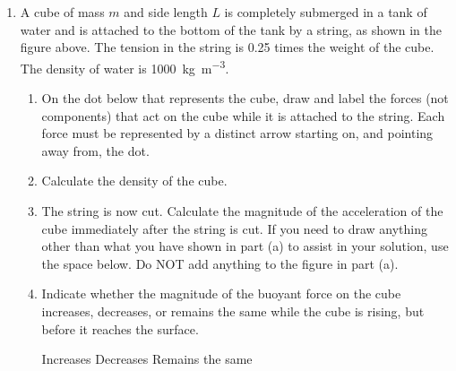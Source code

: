 \documentclass{../../../oss-classkick}
\begin{document}
\begin{enumerate}
  \begin{center}
  \end{center}
\item A cube of mass $m$ and side length $L$ is completely submerged in a tank
  of water and is attached to the bottom of the tank by a string, as shown in
  the figure above. The tension in the string is 0.25 times the weight of the
  cube. The density of water is \SI{1000}{\kilo\gram\per\metre\cubed}.
  \begin{enumerate}
  \item On the dot below that represents the cube, draw and label the forces
    (not components) that act on the cube while it is attached to the string.
    Each force must be represented by a distinct arrow starting on, and pointing
    away from, the dot.
    \begin{center}
      \vspace{.5in}
      \vspace{.5in}
    \end{center}
  \item Calculate the density of the cube.
    \vspace{1.5in}

  \item The string is now cut. Calculate the magnitude of the
    acceleration of the cube immediately after the string is cut. If you need
    to draw anything other than what you have shown in part (a) to assist in
    your solution, use the space below. Do NOT add anything to the figure in
    part (a).
    \vspace{1.5in}
    
  \item Indicate whether the magnitude of the buoyant force on the cube
    increases, decreases, or remains the same while the cube is rising, but
    before it reaches the surface.

    \vspace{.1in}
    \underline{\hspace{.3in}} Increases\hspace{.2in}
    \underline{\hspace{.3in}} Decreases\hspace{.2in}
    \underline{\hspace{.3in}} Remains the same


\end{enumerate}
\end{enumerate}
\end{document}
